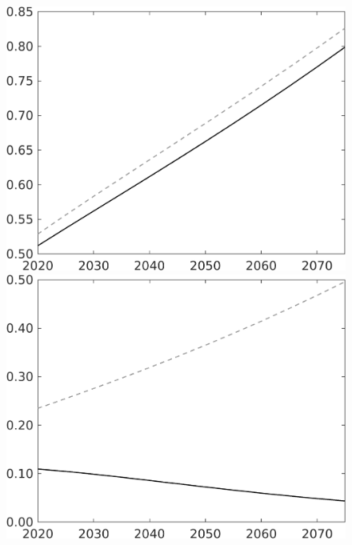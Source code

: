 \documentclass[12pt]{article}
\begin{document}
\begin{figure}[h!!]
\begin{minipage}[]{0.32\textwidth}
\end{minipage}	
	\begin{minipage}[]{0.32\textwidth}
		\includegraphics[width=1\textwidth]{../../codding_model/own_basedOnFried/optimalPol_010922_revision/figures/all_13Sept22/LevTaufNoTauf_TaulCalib_Equlab_regime0_C_spillover0_nsk0_xgr0_knspil1_sep1_LFlimit0_emsbase0_countec0_GovRev0_etaa0.79_lgd0.png}
	\end{minipage}	
	\begin{minipage}[]{0.32\textwidth}
		\includegraphics[width=1\textwidth]{../../codding_model/own_basedOnFried/optimalPol_010922_revision/figures/all_13Sept22/LevTaufNoTauf_TaulCalib_Equlab_regime0_F_spillover0_nsk0_xgr0_knspil1_sep1_LFlimit0_emsbase0_countec0_GovRev0_etaa0.79_lgd0.png}

\end{minipage}
\end{figure}
\end{document}
